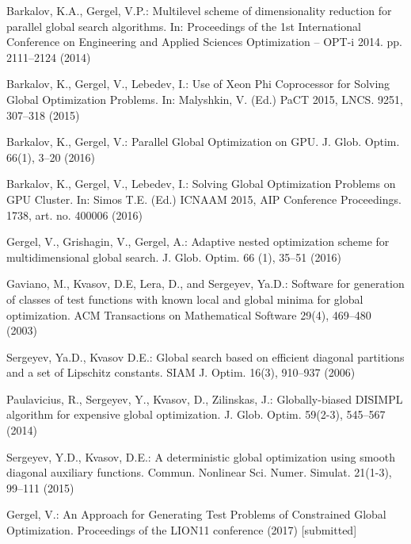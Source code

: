 \documentclass{llncs}
\begin{document}
\begin{thebibliography}{99}
Barkalov, K.A., Gergel, V.P.: Multilevel scheme of dimensionality reduction for parallel global search algorithms. In: Proceedings of the 1st International Conference on Engineering and Applied Sciences Optimization -- OPT-i 2014. pp. 2111--2124 (2014)

Barkalov, K., Gergel, V., Lebedev, I.: Use of Xeon Phi Coprocessor for Solving Global Optimization Problems. In: Malyshkin, V. (Ed.) PaCT 2015, LNCS. 9251, 307--318 (2015)

Barkalov, K., Gergel, V.: Parallel Global Optimization on GPU. J. Glob. Optim. 66(1), 3--20 (2016)

Barkalov, K., Gergel, V., Lebedev, I.: Solving Global Optimization Problems on GPU Cluster. In: Simos T.E. (Ed.) ICNAAM 2015, AIP Conference Proceedings. 1738, art. no. 400006 (2016)

Gergel, V., Grishagin, V., Gergel, A.: Adaptive nested optimization scheme for multidimensional global search. J. Glob. Optim. 66 (1), 35--51 (2016)

Gaviano, M., Kvasov, D.E, Lera, D., and Sergeyev, Ya.D.: Software for generation of classes of test functions with known local and global minima for global optimization. ACM Transactions on Mathematical Software 29(4), 469--480 (2003)

Sergeyev, Ya.D., Kvasov D.E.: Global search based on efficient diagonal partitions and a set of Lipschitz constants. SIAM J. Optim. 16(3), 910--937 (2006)

Paulavicius, R., Sergeyev, Y., Kvasov, D., Zilinskas, J.: Globally-biased DISIMPL algorithm for expensive global optimization. J. Glob. Optim. 59(2-3), 545--567 (2014)

Sergeyev, Y.D., Kvasov, D.E.: A deterministic global optimization using smooth diagonal auxiliary functions. Commun. Nonlinear Sci. Numer. Simulat. 21(1-3), 99--111 (2015)

Gergel, V.: An Approach for Generating Test Problems of Constrained Global Optimization. Proceedings of the LION11 conference (2017) [submitted]

                                                                           
\end{thebibliography}
\end{document}
